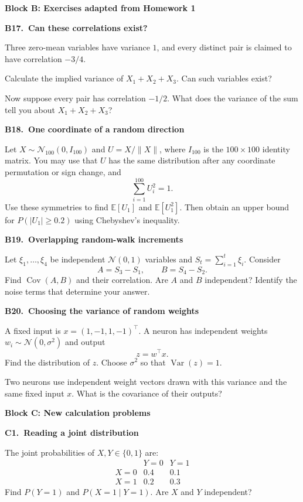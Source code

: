 \documentclass[11pt,a4paper]{article}
\newcommand{\blocktitle}[2]{{\Large\sffamily\bfseries\color{Ink}Block #1: #2}\par\vspace{5pt}}
\newenvironment{question}[2]{\par\addvspace{10pt}\begin{minipage}{\linewidth}{\sffamily\bfseries\color{Ink}#1.\ #2}\par\vspace{3pt}}{\end{minipage}\par}
\newcommand{\E}{\mathbb E}
\newcommand{\Var}{\operatorname{Var}}
\newcommand{\Cov}{\operatorname{Cov}}
\begin{document}
\newpage
\blocktitle{B}{Exercises adapted from Homework 1}
\begin{question}{B17}{Can these correlations exist?}
Three zero-mean variables have variance $1$, and every distinct pair is
claimed to have correlation $-3/4$.

Calculate the implied variance of $X_1+X_2+X_3$. Can such variables exist?

Now suppose every pair has correlation $-1/2$. What does the variance of
the sum tell you about $X_1+X_2+X_3$?
\end{question}

\begin{question}{B18}{One coordinate of a random direction}
Let $X\sim\mathcal N_{100}(0,I_{100})$ and $U=X/\|X\|$, where $I_{100}$
is the $100\times100$ identity matrix. You may use that $U$ has the same
distribution after any coordinate permutation or sign change, and
\[
\sum_{i=1}^{100}U_i^2=1.
\]
Use these symmetries to find $\E[U_1]$ and $\E[U_1^2]$.
Then obtain an upper bound for $P(|U_1|\ge0.2)$ using Chebyshev's inequality.
\end{question}

\begin{question}{B19}{Overlapping random-walk increments}
Let $\xi_1,\ldots,\xi_4$ be independent $\mathcal N(0,1)$ variables and
$S_t=\sum_{i=1}^{t}\xi_i$. Consider
\[
A=S_3-S_1,\qquad B=S_4-S_2.
\]
Find $\Cov(A,B)$ and their correlation. Are $A$ and $B$ independent?
Identify the noise terms that determine your answer.
\end{question}

\begin{question}{B20}{Choosing the variance of random weights}
A fixed input is $x=(1,-1,1,-1)^\top$. A neuron has independent weights
$w_i\sim\mathcal N(0,\sigma^2)$ and output
\[
z=w^\top x.
\]
Find the distribution of $z$. Choose $\sigma^2$ so that $\Var(z)=1$.

Two neurons use independent weight vectors drawn with this variance and
the same fixed input $x$. What is the covariance of their outputs?
\end{question}

\newpage
\blocktitle{C}{New calculation problems}
\begin{question}{C1}{Reading a joint distribution}
The joint probabilities of $X,Y\in\{0,1\}$ are:
\[
\begin{array}{c|cc}
 &Y=0&Y=1\\ \hline
X=0&0.4&0.1\\
X=1&0.2&0.3
\end{array}
\]
Find $P(Y=1)$ and $P(X=1\mid Y=1)$. Are $X$ and $Y$ independent?
\end{question}
\end{document}
